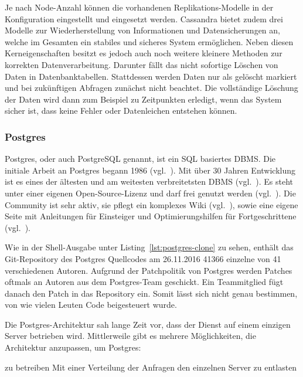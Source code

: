 Je nach Node\hyp{}Anzahl können die vorhandenen Replikations\hyp{}Modelle in
der Konfiguration eingestellt und eingesetzt werden. Cassandra bietet zudem
drei Modelle zur Wiederherstellung von Informationen und Datensicherungen an,
welche im Gesamten ein stabiles und sicheres System ermöglichen. Neben diesen
Kerneigenschaften besitzt es jedoch auch noch weitere kleinere Methoden zur
korrekten Datenverarbeitung. Darunter fällt das nicht sofortige Löschen von
Daten in Datenbanktabellen. Stattdessen werden Daten nur als gelöscht markiert
und bei zukünftigen Abfragen zunächst nicht beachtet. Die vollständige Löschung
der Daten wird dann zum Beispiel zu Zeitpunkten erledigt, wenn das System
sicher ist, dass keine Fehler oder Datenleichen entstehen können.
\nl%

\subsubsection{Postgres}
\label{subsubsec:postgres}
Postgres, oder auch PostgreSQL genannt, ist ein \gls{SQL} basiertes \gls{DBMS}.
Die initiale Arbeit an Postgres begann 1986 (vgl.~\cite{old_postgres}). Mit
über 30 Jahren Entwicklung ist es eines der ältesten und am weitesten
verbreitetsten DBMS (vgl.~\cite{db_ranking}). Es steht unter einer eigenen
Open\hyp{}Source\hyp{}Lizenz und darf frei genutzt werden
(vgl.~\cite{postgres_license}).  Die Community ist sehr aktiv, sie pflegt ein
komplexes Wiki (vgl.~\cite{postgres_wiki}), sowie eine eigene Seite mit
Anleitungen für Einsteiger und Optimierungshilfen für Fortgeschrittene
(vgl.~\cite{postgres_tutorial}).

Wie in der Shell\hyp{}Ausgabe unter Listing~\ref{lst:postgres-clone} zu sehen,
enthält das \gls{Git}-\gls{Repository} des Postgres Quellcodes am 26.11.2016
41366 einzelne  von 41 verschiedenen Autoren. Aufgrund
der Patchpolitik von Postgres werden Patches oftmals an Autoren aus dem
Postgres\hyp{}Team geschickt. Ein Teammitglied fügt danach den Patch in das
Repository ein. Somit lässt sich nicht genau bestimmen, von wie vielen Leuten
Code beigesteuert wurde.

Die Postgres\hyp{}Architektur sah lange Zeit vor, dass der Dienst auf einem
einzigen Server betrieben wird. Mittlerweile gibt es mehrere Möglichkeiten, die
Architektur anzupassen, um Postgres:

\begin{outline}
  \1  zu betreiben
  \1 
  \1 Mit einer Verteilung der Anfragen den einzelnen Server zu entlasten
\end{outline}

